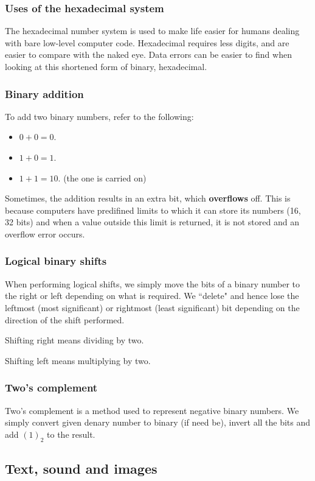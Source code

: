 \documentclass[twocolumn]{article}
\begin{document}
\subsubsection{Uses of the hexadecimal system}
The hexadecimal number system is used to make life easier for humans dealing with 
bare low-level computer code. Hexadecimal requires less digits, and are easier to compare
with the naked eye. Data errors can be easier to find when looking at this shortened form
of binary, hexadecimal.

\subsubsection{Binary addition}
To add two binary numbers, refer to the following:\\
\begin{itemize}
	\item $0 + 0 = 0$.
	\item $1 + 0 = 1$.
	\item $1 + 1 = 10$. (the one is carried on)
\end{itemize}

Sometimes, the addition results in an extra bit, which \textbf{overflows} off. This is
because computers have predifined limits to which it can store its numbers (16, 32 bits)
and when a value outside this limit is returned, it is not stored and an overflow error
occurs.

\subsubsection{Logical binary shifts}
When performing logical shifts, we simply move the bits of a binary number to the right
or left depending on what is required. We ``delete" and hence lose the leftmost (most 
significant) or rightmost (least significant) bit depending on the direction of the shift 
performed.

Shifting right means dividing by two.

Shifting left means multiplying by two.

\subsubsection{Two's complement}
Two's complement is a method used to represent negative binary numbers. We simply
convert given denary number to binary (if need be), invert all the bits and add $(1)_2$ 
to the result.

\subsection{Text, sound and images}
\end{document}
